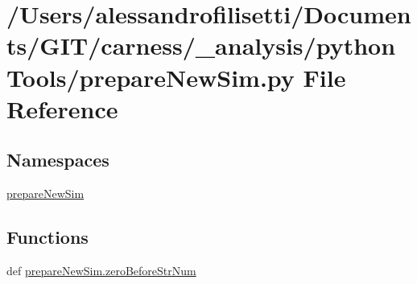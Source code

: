 \hypertarget{a00099}{\section{/\+Users/alessandrofilisetti/\+Documents/\+G\+I\+T/carness/\+\_\+analysis/python\+Tools/prepare\+New\+Sim.py File Reference}
\label{a00099}
}
\subsection*{Namespaces}
\begin{DoxyCompactItemize}
\item 
 \hyperlink{a00155}{prepare\+New\+Sim}
\end{DoxyCompactItemize}
\subsection*{Functions}
\begin{DoxyCompactItemize}
\item 
def \hyperlink{a00155_a6b14bf9916da5f148ec52646dd61250d}{prepare\+New\+Sim.\+zero\+Before\+Str\+Num}
\end{DoxyCompactItemize}
